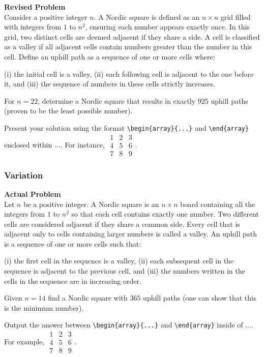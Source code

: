 \textbf{Revised Problem}\\
Consider a positive integer \( n \). A Nordic square is defined as an \( n \times n \) grid filled with integers from \( 1 \) to \( n^2 \), ensuring each number appears exactly once. In this grid, two distinct cells are deemed adjacent if they share a side. A cell is classified as a valley if all adjacent cells contain numbers greater than the number in this cell. Define an uphill path as a sequence of one or more cells where:

(i) the initial cell is a valley,
(ii) each following cell is adjacent to the one before it, and
(iii) the sequence of numbers in these cells strictly increases.

For \( n = 22 \), determine a Nordic square that results in exactly \( 925 \) uphill paths (proven to be the least possible number).

Present your solution using the format \verb|\begin{array}{...}| and \verb|\end{array}| enclosed within $\boxed{...}$. For instance, $\boxed{\begin{array}{ccc}1 & 2 & 3 \\ 4 & 5 & 6 \\ 7 & 8 & 9\end{array}}$.

\subsubsection{Variation}
\textbf{Actual Problem}\\
Let $n$ be a positive integer. A Nordic square is an $n \times n$ board containing all the integers from $1$ to $n^2$ so that each cell contains exactly one number. Two different cells are considered adjacent if they share a common side. Every cell that is adjacent only to cells containing larger numbers is called a valley. An uphill path is a sequence of one or more cells such that:

(i) the first cell in the sequence is a valley,
(ii) each subsequent cell in the sequence is adjacent to the previous cell, and
(iii) the numbers written in the cells in the sequence are in increasing order.

Given $n = 14$ find a Nordic square with $365$ uphill paths (one can show that this is the minimum number).


Output the answer between \verb|\begin{array}{...}| and \verb|\end{array}| inside of $\boxed{...}$. For example, $\boxed{\begin{array}{ccc}1 & 2 & 3 \\ 4 & 5 & 6 \\ 7 & 8 & 9\end{array}}$.

